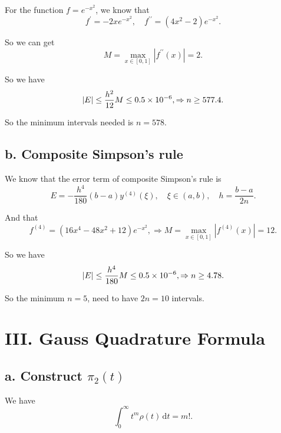 \documentclass[a4paper]{article}
\begin{document}
For the function $f = e^{-x^2}$, we know that 
\begin{equation}
    f^{\prime} = -2x e^{-x^2}, \quad f^{\prime \prime} = (4x^2 - 2) e^{-x^2}.
\end{equation}

So we can get 
\begin{equation}
    M = \max_{x \in [0, 1]} |f^{\prime \prime} (x)| = 2. 
\end{equation}

So we have 
\begin{equation}
    \abs{E} \leq \frac{h^2}{12} M \leq 0.5 \times 10^{-6}, \Rightarrow n \geq 577.4. 
\end{equation}

So the minimum intervals needed is $n = 578$.

\subsection*{b. Composite Simpson's rule}

We know that the error term of composite Simpson's rule is
\begin{equation}
    E = -\frac{h^4}{180}(b-a) y^{(4)} (\xi), \quad \xi \in (a, b), \quad h = \frac{b-a}{2n}.
\end{equation}

And that 
\begin{equation}
    f^{(4)} = (16x^4 - 48x^2 + 12) e^{-x^2}, \Rightarrow M = \max_{x \in [0, 1]} |f^{(4)} (x)| = 12.
\end{equation}

So we have
\begin{equation}
    \abs{E} \leq \frac{h^4}{180} M \leq 0.5 \times 10^{-6}, \Rightarrow n \geq 4.78.
\end{equation}

So the minimum $n = 5$, need to have $2n = 10$ intervals. 


\section*{III. Gauss Quadrature Formula}

\subsection*{a. Construct $\pi_2(t)$}

We have 
\begin{equation}
    \int_{0}^{\infty} t^m \rho(t) \,\mathrm{d}t = m!. 
\end{equation}
\end{document}
